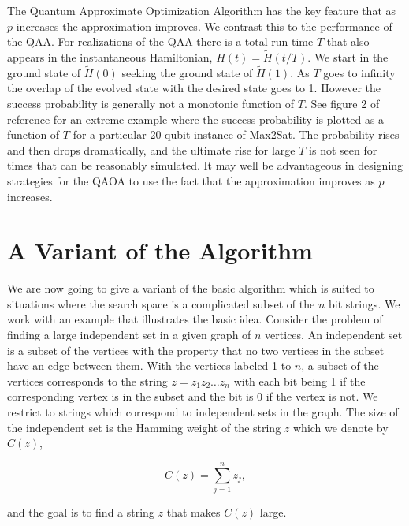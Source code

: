 \documentclass[t11pt,reprint,preprint,preprintnumbers]{revtex4}
\begin{document}
The Quantum Approximate Optimization Algorithm has the key feature that as $p$ increases the approximation improves.  We contrast this to the performance of the QAA.  For realizations of the QAA there is a total run time $T$ that also appears in the instantaneous Hamiltonian,  $H(t)=\widetilde{H} (t/T)$.  We start in the ground state of $\widetilde{H} (0)$ seeking the ground state of $\widetilde{H}  (1)$.  As $T$ goes to infinity the overlap of the evolved state with the desired state goes to 1.  However the success probability is generally not a monotonic function of $T$.  See figure 2 of reference \cite{crosson-2014} for an extreme example where the success probability is plotted as a function of $T$ for a particular 20 qubit instance of Max2Sat. The probability rises and then drops dramatically,  and the ultimate rise for large $T$ is not seen for times that can be reasonably simulated. It may well be advantageous in designing strategies for the QAOA to use the fact that the approximation improves as $p$ increases.

\section{A Variant of the Algorithm}
We are now going to give a variant of the basic algorithm which is suited to situations where the search space is a complicated subset of the $n$ bit strings.  We work with an example that illustrates the basic idea.  Consider the problem of finding a large independent set in a given graph of $n$ vertices.  An independent set is a subset of the vertices with the property that no two vertices in the subset have an edge between them.  With the vertices labeled 1 to $n$, a subset of the vertices corresponds to the string $z= z_1z_2 \ldots z_n$ with each bit being 1 if the corresponding vertex is in the subset and the bit is 0 if the vertex is not.  We restrict to strings which correspond to independent sets in the graph.   The size of the independent set is the Hamming weight of the string $z$ which we denote by $C(z)$,

\begin{equation}
C(z) = \sum_{j = 1}^n z_j,
\end{equation}

\noindent and the goal is to find a string $z$ that makes $C(z)$ large.
\end{document}
